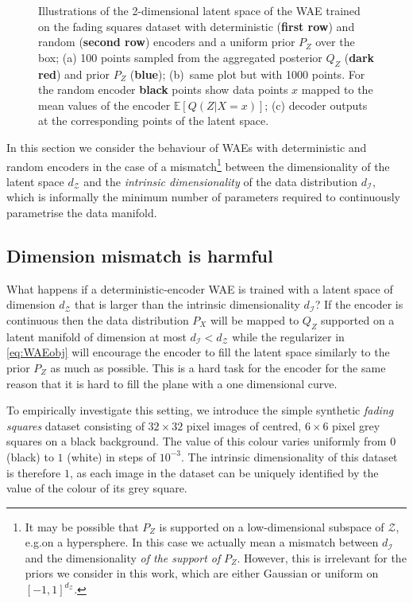 \documentclass{article}
\def\E{\mathbb{E}}
\def\dZ{d_{\mathcal{Z}}}
\def\Z{\mathcal{Z}}
\def\dI{d_\mathcal{I}}
\begin{document}
\begin{figure}[t!]
\begin{minipage}{.315\textwidth}
	\end{minipage}%
	\caption{\label{fig:fading-squares-latent}
		Illustrations of the 2-dimensional latent space of the WAE trained on the fading squares dataset with deterministic ({\bf first row}) and random ({\bf second row}) encoders and a uniform prior $P_Z$ over the box;
		(a) 100 points sampled from the aggregated posterior $Q_Z$ ({\bf dark red}) and prior $P_Z$ ({\bf blue}); 
		(b)~same plot but with 1000 points. For the random encoder {\bf black} points show data points $x$ mapped to the mean values of the encoder $\E[Q(Z|X=x)]$;
		(c) decoder outputs at the corresponding points of the latent space.}
\end{figure}


In this section we consider the behaviour of WAEs with deterministic and random encoders in the case of a mismatch\footnote{
It may be possible that $P_Z$ is supported on a low-dimensional subspace of $\Z$, e.g.\:on a hypersphere. 
In this case we actually mean a mismatch between $\dI$ and the dimensionality \emph{of the support of} $P_Z$.
However, this is irrelevant for the priors we consider in this work, which are either Gaussian or uniform on $[-1,1]^{\dZ}$.
} between the dimensionality of the latent space $\dZ$ and the \emph{intrinsic dimensionality} of the data distribution $\dI$, which is informally the minimum number of parameters required to continuously parametrise the data manifold.


\subsection{\label{section:fading-squares}Dimension mismatch is harmful}
What happens if a deterministic-encoder WAE is trained with a latent space of dimension $\dZ$ that is larger than the intrinsic dimensionality $\dI$? If the encoder is continuous then the data distribution $P_X$ will be mapped to $Q_Z$ supported on a latent manifold of dimension at most $\dI < \dZ$ while the regularizer in \eqref{eq:WAEobj} will encourage the encoder to fill the latent space similarly to the prior $P_Z$ as much as possible.
This is a hard task for the encoder for the same reason that it is hard to fill the plane with a one dimensional curve.

To empirically investigate this setting, we introduce the simple synthetic \emph{fading squares} dataset consisting of $32 \times 32$ pixel images of centred, $6\times 6$ pixel grey squares on a black background. The value of this colour varies uniformly from $0$ (black) to $1$ (white) in steps of $10^{-3}$. The intrinsic dimensionality of this dataset is therefore $1$, as each image in the dataset can be uniquely identified by the value of the colour of its grey square. 
 
\end{document}
